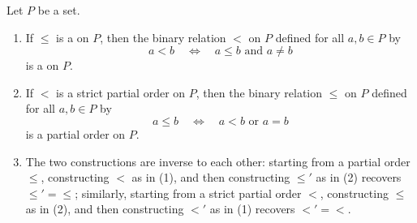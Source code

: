 \begin{proposition} \label{proposition:correspondence_between_partial_orders_and_strict_partial_orders_on_a_set}
    Let $P$ be a set.
    \begin{enumerate}
        \item If $\leq$ is a  on $P$, then the binary relation $<$ on $P$ defined for all $a, b \in P$ by
        \[
        a < b \quad \Longleftrightarrow \quad a \leq b \text{ and } a \neq b
        \]
        is a  on $P$.

        \item If $<$ is a strict partial order on $P$, then the binary relation $\leq$ on $P$ defined for all $a, b \in P$ by
        \[
        a \leq b \quad \Longleftrightarrow \quad a < b \text{ or } a = b
        \]
        is a partial order on $P$.

        \item The two constructions are inverse to each other: starting from a partial order $\leq$, constructing $<$ as in (1), and then constructing $\leq'$ as in (2) recovers $\leq' = \leq$; similarly, starting from a strict partial order $<$, constructing $\leq$ as in (2), and then constructing $<'$ as in (1) recovers $<' = <$.
    \end{enumerate}
\end{proposition}


